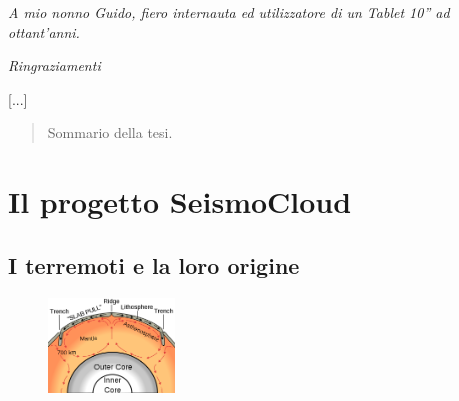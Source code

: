 \documentclass[a4paper,10pt]{memoir}
\begin{document}
  
  
\frontmatter


\maketitle
\cleardoublepage

\vspace*{10cm}
\begin{flushright}
\textsl{A mio nonno Guido, fiero internauta ed utilizzatore di un Tablet 10'' ad ottant'anni.}
\end{flushright}

\cleardoublepage

\LARGE \textsl{Ringraziamenti}

\normalsize
[...]

\cleardoublepage

\begin{abstract}
	\thispagestyle{plain}
	Sommario della tesi.
\end{abstract}
\cleardoublepage

\tableofcontents
\cleardoublepage

\mainmatter

\renewcommand\chapterheadstart{}
\renewcommand\printchaptername{}
\renewcommand\chapternamenum{}
\renewcommand\printchapternum{}
\renewcommand\afterchapternum{}
\renewcommand\printchaptertitle[1]{\chaptitlefont \thechapter. \space #1}

\chapter{Il progetto SeismoCloud}

\section{I terremoti e la loro origine}


\begin{figure}
\includegraphics[width=0.30\textwidth]{introduzione/oceanic_spreading}
\end{figure}
\end{document}
